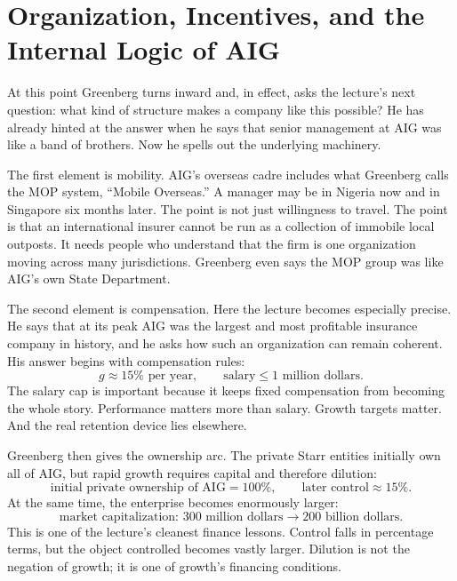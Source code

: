 \section{Organization, Incentives, and the Internal Logic of AIG}

At this point Greenberg turns inward and, in effect, asks the lecture's next question: what kind of structure makes a company like this possible? He has already hinted at the answer when he says that senior management at AIG was like a band of brothers. Now he spells out the underlying machinery.

The first element is mobility. AIG's overseas cadre includes what Greenberg calls the MOP system, ``Mobile Overseas.'' A manager may be in Nigeria now and in Singapore six months later. The point is not just willingness to travel. The point is that an international insurer cannot be run as a collection of immobile local outposts. It needs people who understand that the firm is one organization moving across many jurisdictions. Greenberg even says the MOP group was like AIG's own State Department.

The second element is compensation. Here the lecture becomes especially precise. He says that at its peak AIG was the largest and most profitable insurance company in history, and he asks how such an organization can remain coherent. His answer begins with compensation rules:
\begin{equation}
g \approx 15\% \text{ per year},
\qquad
\text{salary} \le 1\text{ million dollars}.
\end{equation}
The salary cap is important because it keeps fixed compensation from becoming the whole story. Performance matters more than salary. Growth targets matter. And the real retention device lies elsewhere.

Greenberg then gives the ownership arc. The private Starr entities initially own all of AIG, but rapid growth requires capital and therefore dilution:
\begin{equation}
\text{initial private ownership of AIG} = 100\%,
\qquad
\text{later control} \approx 15\%.
\end{equation}
At the same time, the enterprise becomes enormously larger:
\begin{equation}
\text{market capitalization: } 300\text{ million dollars} \to 200\text{ billion dollars}.
\end{equation}
This is one of the lecture's cleanest finance lessons. Control falls in percentage terms, but the object controlled becomes vastly larger. Dilution is not the negation of growth; it is one of growth's financing conditions.

